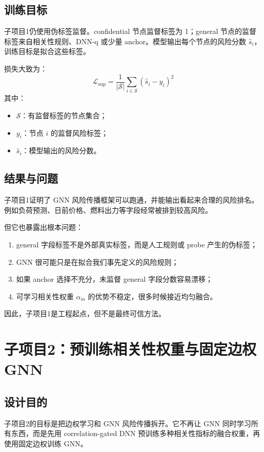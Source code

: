 \documentclass[UTF8]{ctexart}
\begin{document}
\subsection{训练目标}

子项目1仍使用伪标签监督。confidential 节点监督标签为 1；general 节点的监督标签来自相关性规则、DNN-q 或少量 anchor。模型输出每个节点的风险分数 \(\hat{s}_i\)，训练目标是拟合这些标签。

损失大致为：
\[
\mathcal{L}_{\text{sup}}
=
\frac{1}{|\mathcal{S}|}
\sum_{i\in\mathcal{S}}
(\hat{s}_i-y_i)^2
\]
其中：
\begin{itemize}
    \item \(\mathcal{S}\)：有监督标签的节点集合；
    \item \(y_i\)：节点 \(i\) 的监督风险标签；
    \item \(\hat{s}_i\)：模型输出的风险分数。
\end{itemize}

\subsection{结果与问题}

子项目1证明了 GNN 风险传播框架可以跑通，并能输出看起来合理的风险排名。例如负荷预测、日前价格、燃料出力等字段经常被排到较高风险。

但它也暴露出根本问题：
\begin{enumerate}
    \item general 字段标签不是外部真实标签，而是人工规则或 probe 产生的伪标签；
    \item GNN 很可能只是在拟合我们事先定义的风险规则；
    \item 如果 anchor 选择不充分，未监督 general 字段分数容易漂移；
    \item 可学习相关性权重 \(\alpha_m\) 的优势不稳定，很多时候接近均匀融合。
\end{enumerate}

因此，子项目1是工程起点，但不是最终可信方法。

\section{子项目2：预训练相关性权重与固定边权 GNN}

\subsection{设计目的}

子项目2的目标是把边权学习和 GNN 风险传播拆开。它不再让 GNN 同时学习所有东西，而是先用 correlation-gated DNN 预训练多种相关性指标的融合权重，再使用固定边权训练 GNN。
\end{document}
